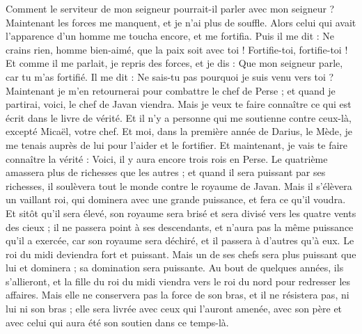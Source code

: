 \begin{multicols}{2}
Comment le serviteur de mon seigneur pourrait-il parler avec mon seigneur ? Maintenant les forces me manquent, et je n'ai plus de souffle.
Alors celui qui avait l'apparence d'un homme me toucha encore, et me fortifia.
Puis il me dit : Ne crains rien, homme bien-aimé, que la paix soit avec toi ! Fortifie-toi, fortifie-toi ! Et comme il me parlait, je repris des forces, et je dis : Que mon seigneur parle, car tu m'as fortifié.
Il me dit : Ne sais-tu pas pourquoi je suis venu vers toi ? Maintenant je m'en retournerai pour combattre le chef de Perse ; et quand je partirai, voici, le chef de Javan viendra.
Mais je veux te faire connaître ce qui est écrit dans le livre de vérité. Et il n'y a personne qui me soutienne contre ceux-là, excepté Micaël, votre chef.
\VerseOne{}Et moi, dans la première année de Darius, le Mède, je me tenais auprès de lui pour l'aider et le fortifier.
Et maintenant, je vais te faire connaître la vérité : Voici, il y aura encore trois rois en Perse. Le quatrième amassera plus de richesses que les autres ; et quand il sera puissant par ses richesses, il soulèvera tout le monde contre le royaume de Javan.
Mais il s'élèvera un vaillant roi, qui dominera avec une grande puissance, et fera ce qu'il voudra.
Et sitôt qu'il sera élevé, son royaume sera brisé et sera divisé vers les quatre vents des cieux ; il ne passera point à ses descendants, et n'aura pas la même puissance qu'il a exercée, car son royaume sera déchiré, et il passera à d'autres qu'à eux.
Le roi du midi deviendra fort et puissant. Mais un de ses chefs sera plus puissant que lui et dominera ; sa domination sera puissante.
Au bout de quelques années, ils s'allieront, et la fille du roi du midi viendra vers le roi du nord pour redresser les affaires. Mais elle ne conservera pas la force de son bras, et il ne résistera pas, ni lui ni son bras ; elle sera livrée avec ceux qui l'auront amenée, avec son père et avec celui qui aura été son soutien dans ce temps-là.

\end{multicols}

